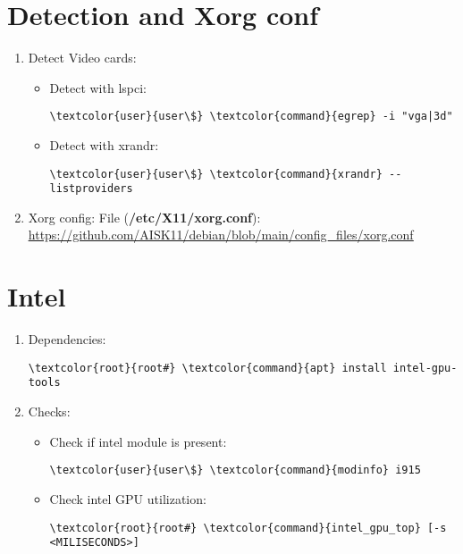 \documentclass[10pt, a4paper, onecolumn, openany]{book} %
\begin{document}
\section{Detection and Xorg conf}
\begin{enumerate}
    \item Detect Video cards:
\begin{itemize}
    \item Detect with lspci:
\begin{Verbatim}[commandchars=\\\{\}]
\textcolor{user}{user\$} \textcolor{command}{egrep} -i "vga|3d"
\end{Verbatim}
    \item Detect with xrandr:
\begin{Verbatim}[commandchars=\\\{\}]
\textcolor{user}{user\$} \textcolor{command}{xrandr} --listproviders
\end{Verbatim}
\end{itemize}
    \item Xorg config:
\newline File (\textbf{\textcolor{file}{/etc/X11/xorg.conf}}):
\newline \underline{\url{https://github.com/AISK11/debian/blob/main/config_files/xorg.conf}}
\end{enumerate}
\section{Intel}
\begin{enumerate}
    \item Dependencies:
\begin{Verbatim}[commandchars=\\\{\}]
\textcolor{root}{root#} \textcolor{command}{apt} install intel-gpu-tools
\end{Verbatim}
    \item Checks:
\begin{itemize}
    \item Check if intel module is present:
\begin{Verbatim}[commandchars=\\\{\}]
\textcolor{user}{user\$} \textcolor{command}{modinfo} i915
\end{Verbatim}
    \item Check intel GPU utilization:
\begin{Verbatim}[commandchars=\\\{\}]
\textcolor{root}{root#} \textcolor{command}{intel_gpu_top} [-s <MILISECONDS>]
\end{Verbatim}
\end{itemize}
\end{enumerate}
\end{document}
